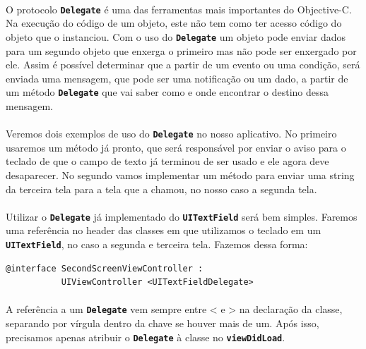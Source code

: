 \documentclass[a4paper,12pt,brazil,doubleside]{book}
\begin{document}
\paragraph{}O protocolo \texttt{\textbf{Delegate}} é uma das ferramentas mais importantes do Objective-C. Na execução do código de um objeto, este não tem como ter acesso código do objeto que o instanciou. Com o uso do \texttt{\textbf{Delegate}} um objeto pode enviar dados para um segundo objeto que enxerga o primeiro mas não pode ser enxergado por ele. Assim é possível determinar que a partir de um evento ou uma condição, será enviada uma mensagem, que pode ser uma notificação ou um dado, a partir de um método \texttt{\textbf{Delegate}} que vai saber como e onde encontrar o destino dessa mensagem.
\paragraph{}Veremos dois exemplos de uso do \texttt{\textbf{Delegate}} no nosso aplicativo. No primeiro usaremos um método já pronto, que será responsável por enviar o aviso para o teclado de que o campo de texto já terminou de ser usado e ele agora deve desaparecer. No segundo vamos implementar um método para enviar uma string da terceira tela para a tela que a chamou, no nosso caso a segunda tela.

\paragraph{}Utilizar o \texttt{\textbf{Delegate}} já implementado do \texttt{\textbf{UITextField}} será bem simples. Faremos uma referência no header das classes em que utilizamos o teclado em um \texttt{\textbf{UITextField}}, no caso a segunda e terceira tela. Fazemos dessa forma:

\begin{listing}
\begin{verbatim}
@interface SecondScreenViewController :
           UIViewController <UITextFieldDelegate>
\end{verbatim}
\end{listing}

\paragraph{}A referência a um \texttt{\textbf{Delegate}} vem sempre entre < e > na declaração da classe, separando por vírgula dentro da chave se houver mais de um. Após isso, precisamos apenas atribuir o \texttt{\textbf{Delegate}} à classe no \texttt{\textbf{viewDidLoad}}.
\end{document}
